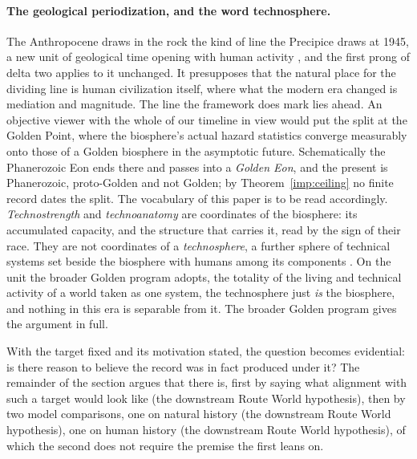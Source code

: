 \paragraph{The geological periodization, and the word technosphere.}\label{gc:rem:technosphere}
The Anthropocene draws in the rock the kind of line the Precipice draws
at 1945, a new unit of geological time opening with human activity
\cite{Crutzen02}, and the first prong of delta two applies to it
unchanged. It presupposes that the natural place for the dividing line
is human civilization itself, where what the modern era changed is
mediation and magnitude. The line the framework does mark lies ahead.
An objective viewer with the whole of our timeline in view would put
the split at the Golden Point, where the biosphere's actual hazard
statistics converge measurably onto those of a Golden biosphere in the
asymptotic future. Schematically the Phanerozoic Eon ends there and
passes into a \emph{Golden Eon}, and the present is Phanerozoic,
proto-Golden and not Golden; by Theorem~\ref{imp:ceiling} no finite
record dates the split. The vocabulary of this paper is to be read
accordingly. \emph{Technostrength} and \emph{technoanatomy} are
coordinates of the biosphere: its accumulated capacity, and the structure
that carries it, read by the sign of their race. They are not coordinates of
a \emph{technosphere}, a further sphere of technical systems set beside
the biosphere with humans among its components \cite{Haff14}. On the
unit the broader Golden program adopts, the totality of the living and
technical activity of a world taken as one system, the technosphere
just \emph{is} the biosphere, and nothing in this era is separable from
it. The broader Golden program gives the argument in full.


With the target fixed and its motivation stated, the question becomes
evidential: is there reason to believe the record was in fact produced
under it? The remainder of the section argues that there is, first by
saying what alignment with such a target would look like
(the downstream Route World hypothesis), then by two model comparisons, one on
natural history (the downstream Route World hypothesis), one on human history
(the downstream Route World hypothesis), of which the second does not require
the premise the first leans on.


